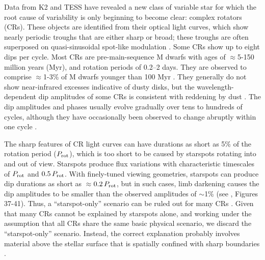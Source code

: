 \documentclass[11pt,twocolumn,tighten]{aastex63}
\begin{document}
Data from K2 \citep{2014PASP..126..398H} and TESS
\citep{2015JATIS...1a4003R} have revealed a new class of variable
star for which the root cause of variability is only beginning to
become clear: complex rotators (CRs).  These objects
are identified from their optical light curves, which show nearly
periodic troughs that are either sharp or broad; these troughs are
often superposed on quasi-sinusoidal spot-like modulation
\citep{2017AJ....153..152S,2018AJ....155...63S,2019ApJ...876..127Z}.
Some CRs show up to eight dips per cycle.  Most CRs are
pre-main-sequence M dwarfs with ages of $\approx$5-150 million years
(Myr), and rotation periods of 0.2--2 days.  They are observed to
comprise $\approx$1-3\% of M dwarfs younger than 100 Myr
\citep{2016AJ....152..114R,2022AJ....163..144G}.  They generally do
not show near-infrared excesses indicative of dusty disks, but the
wavelength-dependent dip amplitudes of some CRs is consistent with
reddening by dust
\citep{2017PASJ...69L...2O,2020AJ....160...86B,2022AJ....163..144G,2023MNRAS.518.2921K}.
The dip amplitudes and phases usually evolve gradually over tens to
hundreds of cycles, although they have occasionally been observed to
change abruptly within one cycle
\citep[e.g.][]{2017AJ....153..152S,2022ApJ...925...75P,2023ApJ...945..114P}.

The sharp features of CR light curves can have durations as short as
5\% of the rotation period ($P_{\rm rot}$), which is too short to be
caused by starspots rotating into and out of view.  Starspots produce
flux variations with characteristic timescales of $P_{\rm rot}$ and
$0.5\,P_{\rm rot}$.  With finely-tuned viewing geometries, starspots
can produce dip durations as short as $\approx$$0.2\,P_{\rm rot}$, but
in such cases, limb darkening causes the dip amplitudes to be smaller
than the observed amplitudes of $\sim$1\% (see
\citealt{2017AJ....153..152S}, Figures 37-41).  Thus, a
``starspot-only'' scenario can be ruled out for many CRs
\citep{2017AJ....153..152S,2019ApJ...876..127Z,2021MNRAS.500.1366K}.
Given that many CRs cannot be explained by starspots alone, and
working under the assumption that all CRs share the same basic
physical scenario, we discard the ``starspot-only'' scenario.
Instead, the correct explanation probably involves material above the
stellar surface that is spatially confined with sharp boundaries
\citep[e.g.][]{2017AJ....153..152S,2022AJ....163..144G}.
\end{document}
